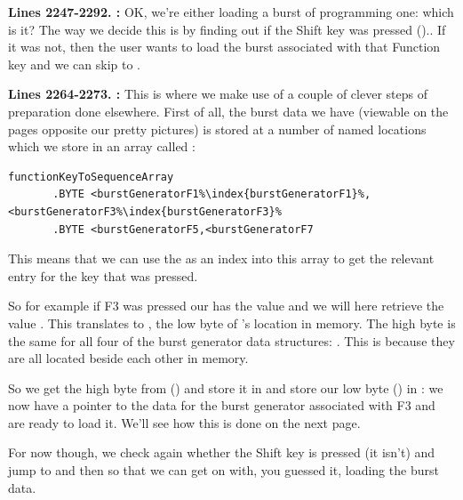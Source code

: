 \textbf{Lines 2247-2292. :} OK, we're either loading a burst of programming one: which is it?
The way we decide this is by finding out if the Shift key was pressed ().. If it was not, then the user wants to load the burst associated with
that Function key and we can skip to .

\textbf{Lines 2264-2273. :} This is where we make use of a couple of clever steps of preparation
done elsewhere. First of all, the burst data we have (viewable on the pages opposite our pretty pictures) is stored at a number of named locations
which we store in an array called :
\begin{lstlisting}[escapechar=\%]
functionKeyToSequenceArray
       .BYTE <burstGeneratorF1%\index{burstGeneratorF1}%,<burstGeneratorF3%\index{burstGeneratorF3}%
       .BYTE <burstGeneratorF5,<burstGeneratorF7
\end{lstlisting}
This means that we can use the  as an index into this array to get the relevant entry for the key that was pressed. 

So for example if F3 was pressed our  has the value  and we will here retrieve the value . This
translates to , the low byte of 's location in memory. The high byte is the same for all four of the burst generator
data structures: . This is because they are all located beside each other in memory.

 So we get the high byte from  ()
and store it in  and store our low byte () in : we now have a pointer to the data for the burst generator
associated with F3 and are ready to load it. We'll see how this is done on the next page. 

For now though, we check again whether the Shift key is pressed (it isn't) and jump to  and then  so that we
can get on with, you guessed it, loading the burst data.

